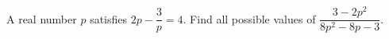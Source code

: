 A real number $p$ satisfies $2p-\dfrac3p=4$. Find all possible values of $\dfrac{3-2p^2}{8p^2-8p-3}$.

